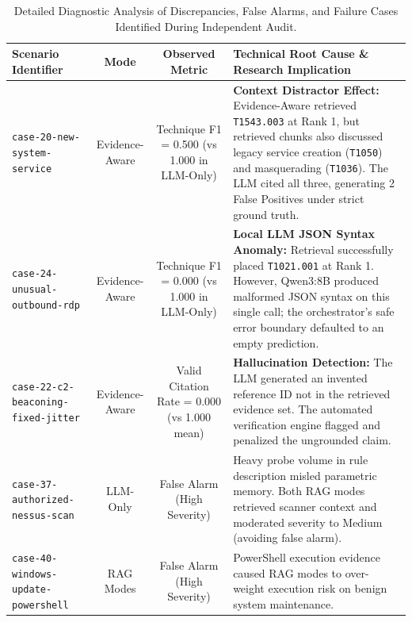\begin{table}[t]
\centering
\small
\caption{Detailed Diagnostic Analysis of Discrepancies, False Alarms, and Failure Cases Identified During Independent Audit.}
\label{tab:failure_cases}
\begin{tabular}{p{3.2cm}ccp{9.0cm}}
\toprule
\textbf{Scenario Identifier} & \textbf{Mode} & \textbf{Observed Metric} & \textbf{Technical Root Cause \& Research Implication} \\
\midrule
\texttt{case-20-new-system-service} & Evidence-Aware & Technique F1 = 0.500 (vs 1.000 in LLM-Only) & \textbf{Context Distractor Effect:} Evidence-Aware retrieved \texttt{T1543.003} at Rank 1, but retrieved chunks also discussed legacy service creation (\texttt{T1050}) and masquerading (\texttt{T1036}). The LLM cited all three, generating 2 False Positives under strict ground truth. \\
\addlinespace
\texttt{case-24-unusual-outbound-rdp} & Evidence-Aware & Technique F1 = 0.000 (vs 1.000 in LLM-Only) & \textbf{Local LLM JSON Syntax Anomaly:} Retrieval successfully placed \texttt{T1021.001} at Rank 1. However, Qwen3:8B produced malformed JSON syntax on this single call; the orchestrator's safe error boundary defaulted to an empty prediction. \\
\addlinespace
\texttt{case-22-c2-beaconing-fixed-jitter} & Evidence-Aware & Valid Citation Rate = 0.000 (vs 1.000 mean) & \textbf{Hallucination Detection:} The LLM generated an invented reference ID not in the retrieved evidence set. The automated verification engine flagged and penalized the ungrounded claim. \\
\addlinespace
\texttt{case-37-authorized-nessus-scan} & LLM-Only & False Alarm (High Severity) & Heavy probe volume in rule description misled parametric memory. Both RAG modes retrieved scanner context and moderated severity to Medium (avoiding false alarm). \\
\addlinespace
\texttt{case-40-windows-update-powershell} & RAG Modes & False Alarm (High Severity) & PowerShell execution evidence caused RAG modes to over-weight execution risk on benign system maintenance. \\
\bottomrule
\end{tabular}
\end{table}


